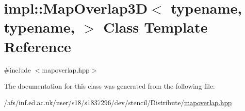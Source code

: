 \hypertarget{classimpl_1_1MapOverlap3D}{\section{impl\-:\-:Map\-Overlap3\-D$<$ typename, typename, $>$ Class Template Reference}
\label{classimpl_1_1MapOverlap3D}
}


{\ttfamily \#include $<$mapoverlap.\-hpp$>$}



The documentation for this class was generated from the following file\-:\begin{DoxyCompactItemize}
\item 
/afs/inf.\-ed.\-ac.\-uk/user/s18/s1837296/dev/stencil/\-Distribute/\hyperlink{mapoverlap_8hpp}{mapoverlap.\-hpp}\end{DoxyCompactItemize}
